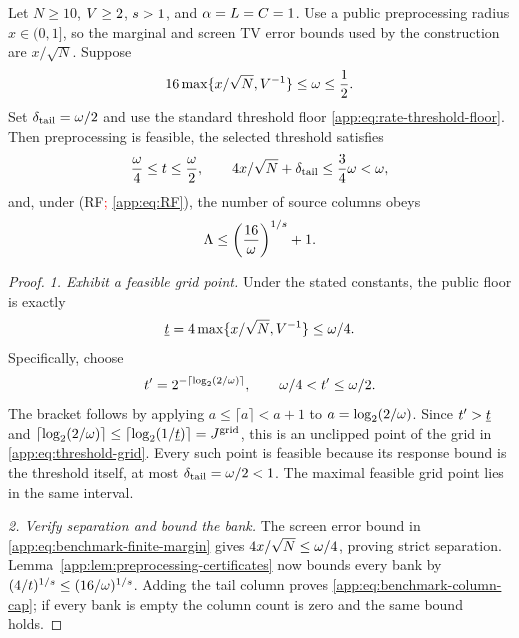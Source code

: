 \begin{lemma}
\label{app:lem:benchmark-feasibility}
Let $N\ge10$, $V\ge2$, $s>1$, and
$\alpha=L=C=1$.
Use a public preprocessing radius $x\in(0,1]$, so the marginal and screen
TV error bounds used by the construction are $x/\sqrt N$.
Suppose
\begin{equation}
 16\max\{x/\sqrt N,V^{-1}\}
 \le\omega\le\frac12.
 \label{app:eq:benchmark-finite-margin}
\end{equation}
Set $\delta_{\mathrm{tail}}=\omega/2$ and use the standard threshold floor
\eqref{app:eq:rate-threshold-floor}.  Then preprocessing is feasible,
the selected threshold satisfies
\begin{equation}
 \frac{\omega}{4}\le t\le\frac{\omega}{2},
 \qquad
 4x/\sqrt N+\delta_{\mathrm{tail}}\le\frac34\omega<\omega,
 \label{app:eq:benchmark-threshold-and-separation}
\end{equation}
and, under (RF\textcolor{red}{; \cref{app:eq:RF}}), the number of source columns obeys
\begin{equation}
 \Lambda
 \le \left(\frac{16}{\omega}\right)^{1/s}+1.
 \label{app:eq:benchmark-column-cap}
\end{equation}
\end{lemma}

\begin{proof}

\emph{1. Exhibit a feasible grid point.}
Under the stated constants, the public floor is exactly
\[
 \underline t
 =4\max\{x/\sqrt N,V^{-1}\}\le\omega/4.
\]
Specifically, choose
\[
 t'=2^{-\lceil\log_2(2/\omega)\rceil},
 \qquad \omega/4<t'\le\omega/2.
\]
The bracket follows by applying $a\le\lceil a\rceil<a+1$ to
$a=\log_2(2/\omega)$.  Since $t'>\underline t$ and
$\lceil\log_2(2/\omega)\rceil
 \le\lceil\log_2(1/\underline t)\rceil=J^{\mathrm{grid}}$,
this is an unclipped point of the grid in \eqref{app:eq:threshold-grid}.
Every such point is feasible because its response bound is the threshold
itself, at most $\delta_{\mathrm{tail}}=\omega/2<1$.
The maximal feasible grid point lies in the same interval.

\emph{2. Verify separation and bound the bank.}
The screen error bound in \eqref{app:eq:benchmark-finite-margin} gives
$4x/\sqrt N\le\omega/4$, proving strict separation.
Lemma~\ref{app:lem:preprocessing-certificates} now bounds every bank by
$(4/t)^{1/s}
\le(16/\omega)^{1/s}$.
Adding the tail column proves \eqref{app:eq:benchmark-column-cap}; if every
bank is empty the column count is zero and the same bound holds.
\end{proof}

